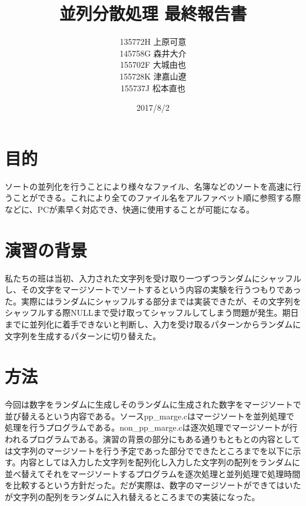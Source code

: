 \documentclass[11pt,a4paper]{jsarticle}
\begin{document}
\title{並列分散処理 最終報告書}
\author{135772H 上原可意\\145758G 森井大介\\155702F 大城由也\\155728K 津嘉山遼\\155737J 松本直也\\}
\date{2017/8/2}

\maketitle
\newpage
\section*{目的}
ソートの並列化を行うことにより様々なファイル、名簿などのソートを高速に行うことができる。これにより全てのファイル名をアルファベット順に参照する際などに、PCが素早く対応でき、快適に使用することが可能になる。

\section*{演習の背景}
私たちの班は当初、入力された文字列を受け取り一つずつランダムにシャッフルし、その文字をマージソートでソートするという内容の実験を行うつもりであった。実際にはランダムにシャッフルする部分までは実装できたが、その文字列をシャッフルする際NULLまで受け取ってシャッフルしてしまう問題が発生。期日までに並列化に着手できないと判断し、入力を受け取るパターンからランダムに文字列を生成するパターンに切り替えた。

\section*{方法}
今回は数字をランダムに生成しそのランダムに生成された数字をマージソートで並び替えるという内容である。ソースpp\_marge.cはマージソートを並列処理で処理を行うプログラムである。non\_pp\_marge.cは逐次処理でマージソートが行われるプログラムである。演習の背景の部分にもある通りもともとの内容としては文字列のマージソートを行う予定であった部分でできたところまでを以下に示す。内容としては入力した文字列を配列化し入力した文字列の配列をランダムに並べ替えてそれをマージソートするプログラムを逐次処理と並列処理で処理時間を比較するという方針だった。だが実際は、数字のマージソートができてはいたが文字列の配列をランダムに入れ替えるところまでの実装になった。
\end{document}
